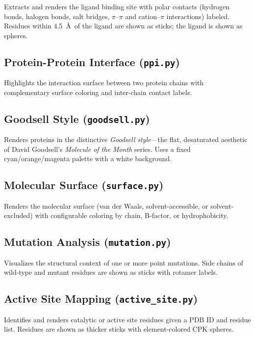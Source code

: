 \documentclass[12pt,a4paper]{article}
\begin{document}
Extracts and renders the ligand binding site with polar contacts (hydrogen bonds, halogen bonds, salt bridges, $\pi$--$\pi$ and cation--$\pi$ interactions) labeled. Residues within 4.5~\AA\ of the ligand are shown as sticks; the ligand is shown as spheres.

\subsection{Protein-Protein Interface (\texttt{ppi.py})}
\label{sec:ppi}

Highlights the interaction surface between two protein chains with complementary surface coloring and inter-chain contact labels.

\subsection{Goodsell Style (\texttt{goodsell.py})}
\label{sec:goodsell}

Renders proteins in the distinctive \emph{Goodsell style}---the flat, desaturated aesthetic of David Goodsell's \emph{Molecule of the Month} series. Uses a fixed cyan/orange/magenta palette with a white background.

\subsection{Molecular Surface (\texttt{surface.py})}
\label{sec:surface}

Renders the molecular surface (van der Waals, solvent-accessible, or solvent-excluded) with configurable coloring by chain, B-factor, or hydrophobicity.

\subsection{Mutation Analysis (\texttt{mutation.py})}
\label{sec:mutation}

Visualizes the structural context of one or more point mutations. Side chains of wild-type and mutant residues are shown as sticks with rotamer labels.

\subsection{Active Site Mapping (\texttt{active\_site.py})}
\label{sec:active_site}

Identifies and renders catalytic or active site residues given a PDB ID and residue list. Residues are shown as thicker sticks with element-colored CPK spheres.
\end{document}
